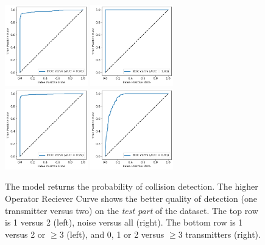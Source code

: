 \documentclass[12pt]{article}
\begin{document}
\begin{figure}[!tb]
\centering
\includegraphics[width=0.32\textwidth]{fig_feb12_AUC_1vs2}
\includegraphics[width=0.32\textwidth]{fig_feb12_AUC_0vs123}\\
\includegraphics[width=0.32\textwidth]{fig_feb12_AUC_1vs23}
\includegraphics[width=0.32\textwidth]{fig_feb12_AUC_012vs3}
\caption{The model returns the probability of collision detection. The higher Operator Reciever Curve shows the better quality of detection (one transmitter versus two) on the \emph{test part} of the dataset.
The top row is 
1 versus 2 (left), %
noise versus all (right). 
The bottom row is 1 versus 2 or $\geq3$ (left), and 
0, 1 or 2 versus $\geq3$ transmitters (right).
}
\label{fig:AUC_1v2}
\end{figure}
\end{document}
